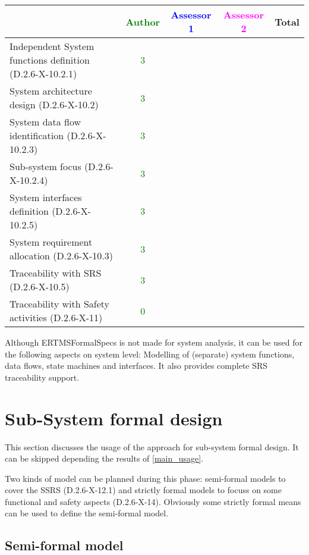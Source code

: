 \begin{author_comment}
\begin{tabular}{|l | c | c | c | c|}
\hline
& \textcolor{green}{Author} & \textcolor{blue}{Assessor 1} & \textcolor{magenta}{Assessor 2} & Total \\
\hline
Independent System functions definition (D.2.6-X-10.2.1)  & \textcolor{green}{3} & & &  \\
\hline 
System architecture design (D.2.6-X-10.2) & \textcolor{green}{3} & & &  \\
\hline
System data flow identification (D.2.6-X-10.2.3)  & \textcolor{green}{3} & & &  \\
\hline
Sub-system focus (D.2.6-X-10.2.4)  & \textcolor{green}{3} & & &  \\
\hline
System interfaces definition (D.2.6-X-10.2.5)  & \textcolor{green}{3} & & &  \\
\hline
System requirement allocation (D.2.6-X-10.3)  & \textcolor{green}{3} & & &  \\
\hline
Traceability with SRS (D.2.6-X-10.5)  & \textcolor{green}{3} & & &  \\
\hline
Traceability with Safety activities (D.2.6-X-11)  & \textcolor{green}{0} & & &  \\
\hline
\end{tabular}

\begin{author_comment}
Although ERTMSFormalSpecs is not made for system analysis, it can be used for the following aspects on system level: Modelling of (separate) system functions, data flows, state machines and interfaces. It also provides complete SRS traceability support.  
\end{author_comment}


\section{Sub-System formal design}
This section discusses the usage of the approach for sub-system formal design.
It can be skipped depending the results of \ref{main_usage}.

Two kinds of model can be planned during this phase: semi-formal models to  cover the SSRS (D.2.6-X-12.1) and strictly formal  models to  focuss on some functional and safety aspects (D.2.6-X-14).  Obviously some strictly  formal means can be used to define the semi-formal  model.

\subsection{Semi-formal model}


\end{author_comment}
